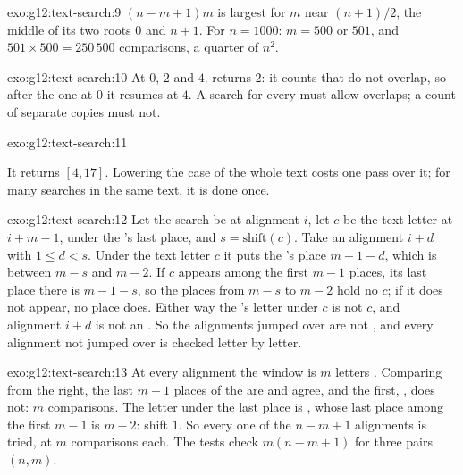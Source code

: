 \begin{solution}{exo:g12:text-search:9}
$(n - m + 1)m$ is largest for $m$ near $(n + 1)/2$, the middle of its two roots $0$ and $n + 1$. For $n = 1000$:
$m = 500$ or $501$, and $501 \times 500 = 250\,500$ comparisons, a quarter of $n^2$.
\end{solution}

\begin{solution}{exo:g12:text-search:10}
At $0$, $2$ and $4$.  returns $2$: it counts  that do not overlap, so after the one at $0$ it
resumes at $4$. A search for every  must allow overlaps; a count of separate copies must not.
\end{solution}

\begin{solution}{exo:g12:text-search:11}
\smallskip\noindent\hspace*{2em}

\noindent\hspace*{4em}

\smallskip\noindent It returns $[4, 17]$. Lowering the case of the whole text costs one pass over it; for many searches
in the same text, it is done once.
\end{solution}

\begin{solution}{exo:g12:text-search:12}
Let the search be at alignment $i$, let $c$ be the text letter at $i + m - 1$, under the 's last place, and
$s = \mathrm{shift}(c)$. Take an alignment $i + d$ with $1 \le d < s$. Under the text letter $c$ it puts the 's
place $m - 1 - d$, which is between $m - s$ and $m - 2$. If $c$ appears among the first $m - 1$ places, its last place
there is $m - 1 - s$, so the places from $m - s$ to $m - 2$ hold no $c$; if it does not appear, no place does. Either
way the 's letter under $c$ is not $c$, and alignment $i + d$ is not an . So the alignments jumped
over are not , and every alignment not jumped over is checked letter by letter.
\end{solution}

\begin{solution}{exo:g12:text-search:13}
At every alignment the window is $m$ letters . Comparing from the right, the last $m - 1$ places of the 
are  and agree, and the first, , does not: $m$ comparisons. The letter under the last place is
, whose last place among the first $m - 1$ is $m - 2$: shift $1$. So every one of the $n - m + 1$ alignments is
tried, at $m$ comparisons each. The tests check $m(n - m + 1)$ for three pairs $(n, m)$.
\end{solution}

